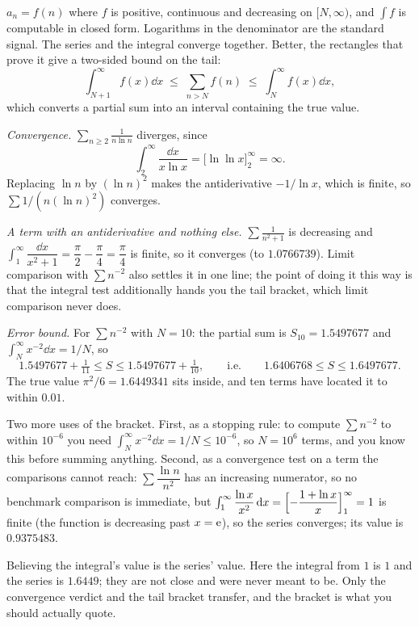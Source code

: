 \cue $a_n=f(n)$ where $f$ is positive, continuous and decreasing on $[N,\infty)$, and $\int f$ is computable in closed form. Logarithms in the denominator are the standard signal.
\method The series and the integral converge together. Better, the rectangles that prove it give a two-sided bound on the tail:
\[\int_{N+1}^{\infty}f(x)\dd x\;\leq\;\sum_{n>N}f(n)\;\leq\;\int_{N}^{\infty}f(x)\dd x,\]
which converts a partial sum into an interval containing the true value.

\begin{worked}
\emph{Convergence.} $\displaystyle\sum_{n\geq2}\frac{1}{n\ln n}$ diverges, since
\[\int_2^{\infty}\frac{\dd x}{x\ln x}=\bigl[\ln\ln x\bigr]_2^{\infty}=\infty.\]
Replacing $\ln n$ by $(\ln n)^2$ makes the antiderivative $-1/\ln x$, which is finite, so $\sum1/(n(\ln n)^2)$ converges.

\emph{A term with an antiderivative and nothing else.} $\displaystyle\sum\frac{1}{n^2+1}$ is decreasing and $\int_1^{\infty}\dfrac{\dd x}{x^2+1}=\dfrac{\pi}{2}-\dfrac{\pi}{4}=\dfrac{\pi}{4}$ is finite, so it converges (to $1.0766739$). Limit comparison with $\sum n^{-2}$ also settles it in one line; the point of doing it this way is that the integral test additionally hands you the tail bracket, which limit comparison never does.

\emph{Error bound.} For $\sum n^{-2}$ with $N=10$: the partial sum is $S_{10}=1.5497677$ and $\int_N^\infty x^{-2}\dd x=1/N$, so
\[1.5497677+\tfrac{1}{11}\leq S\leq1.5497677+\tfrac{1}{10},\qquad\text{i.e.}\qquad 1.6406768\leq S\leq1.6497677.\]
The true value $\pi^2/6=1.6449341$ sits inside, and ten terms have located it to within $0.01$.
\end{worked}

Two more uses of the bracket. First, as a stopping rule: to compute $\sum n^{-2}$ to within $10^{-6}$ you need $\int_N^\infty x^{-2}\dd x=1/N\leq10^{-6}$, so $N=10^{6}$ terms, and you know this before summing anything. Second, as a convergence test on a term the comparisons cannot reach: $\sum\dfrac{\ln n}{n^2}$ has an increasing numerator, so no benchmark comparison is immediate, but $\int_1^\infty\dfrac{\ln x}{x^2}\,\mathrm{d} x=\Bigl[-\dfrac{1+\ln x}{x}\Bigr]_1^\infty=1$ is finite (the function is decreasing past $x=\mathrm{e}$), so the series converges; its value is $0.9375483$.

\begin{trap}
Believing the integral's value is the series' value. Here the integral from $1$ is $1$ and the series is $1.6449$; they are not close and were never meant to be. Only the convergence verdict and the tail bracket transfer, and the bracket is what you should actually quote.
\end{trap}

